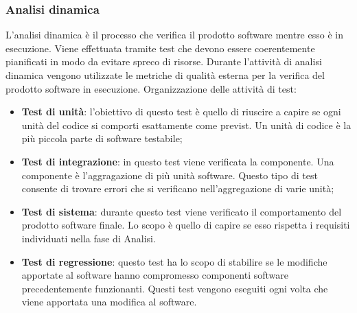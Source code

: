     \subsubsection{Analisi dinamica}
    L'analisi dinamica è il processo che verifica il prodotto software mentre esso è in esecuzione. Viene effettuata tramite test che devono essere coerentemente pianificati in modo da evitare spreco di risorse.
    Durante l'attività di analisi dinamica vengono utilizzate le metriche di qualità esterna per la verifica del prodotto software in esecuzione.
    Organizzazione delle attività di test:
    \begin{itemize}
      \item \textbf{Test di unità}: l'obiettivo di questo test è quello di riuscire a capire se ogni unità del codice si comporti esattamente come previst. Un unità di codice è la più piccola parte di software testabile;
      \item \textbf{Test di integrazione}: in questo test viene verificata la componente. Una componente è l'aggragazione di più unità software.
      Questo tipo di test consente di trovare errori che si verificano nell'aggregazione di varie unità;
      \item \textbf{Test di sistema}: durante questo test viene verificato il comportamento del prodotto software finale. Lo scopo è quello di capire se esso rispetta i requisiti individuati nella fase di Analisi.
      \item \textbf{Test di regressione}: questo test ha lo scopo di stabilire se le modifiche apportate al software hanno compromesso componenti software precedentemente funzionanti.
      Questi test vengono eseguiti ogni volta che viene apportata una modifica al software.
    \end{itemize}
